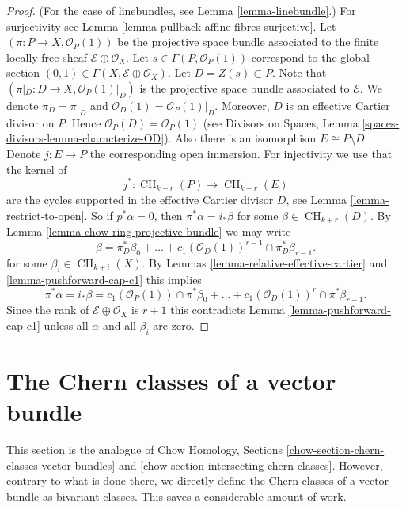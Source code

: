 \documentclass{stacks-project}
\theoremstyle{plain}
\theoremstyle{definition}
\theoremstyle{remark}
\numberwithin{equation}{subsection}
\def\CH{\mathop{\mathrm{CH}}\nolimits}
\begin{document}
\begin{proof}
(For the case of linebundles, see Lemma \ref{lemma-linebundle}.)
For surjectivity see Lemma \ref{lemma-pullback-affine-fibres-surjective}.
Let $(\pi  : P \to X, \mathcal{O}_P(1))$
be the projective space bundle associated
to the finite locally free sheaf $\mathcal{E} \oplus \mathcal{O}_X$.
Let $s \in \Gamma(P, \mathcal{O}_P(1))$ correspond to the global
section $(0, 1) \in \Gamma(X, \mathcal{E} \oplus \mathcal{O}_X)$.
Let $D = Z(s) \subset P$. Note that
$(\pi|_D : D \to X , \mathcal{O}_P(1)|_D)$
is the projective space bundle associated
to $\mathcal{E}$. We denote $\pi_D = \pi|_D$ and
$\mathcal{O}_D(1) = \mathcal{O}_P(1)|_D$.
Moreover, $D$ is an effective
Cartier divisor on $P$. Hence $\mathcal{O}_P(D) = \mathcal{O}_P(1)$
(see Divisors on Spaces, Lemma \ref{spaces-divisors-lemma-characterize-OD}).
Also there is an isomorphism
$E \cong P \setminus D$. Denote $j : E \to P$ the
corresponding open immersion.
For injectivity we use that the kernel of
$$
j^* :
\CH_{k + r}(P)
\longrightarrow
\CH_{k + r}(E)
$$
are the cycles supported in the effective Cartier divisor $D$,
see Lemma \ref{lemma-restrict-to-open}. So if $p^*\alpha = 0$, then
$\pi^*\alpha = i_*\beta$ for some $\beta \in \CH_{k + r}(D)$.
By Lemma \ref{lemma-chow-ring-projective-bundle} we may write
$$
\beta = \pi_D^*\beta_0 +
\ldots + c_1(\mathcal{O}_D(1))^{r - 1} \cap \pi_D^* \beta_{r - 1}.
$$
for some $\beta_i \in \CH_{k + i}(X)$.
By Lemmas \ref{lemma-relative-effective-cartier}
and \ref{lemma-pushforward-cap-c1}
this implies
$$
\pi^*\alpha = i_*\beta =
c_1(\mathcal{O}_P(1)) \cap \pi^*\beta_0 +
\ldots +
c_1(\mathcal{O}_D(1))^r \cap \pi^*\beta_{r - 1}.
$$
Since the rank of $\mathcal{E} \oplus \mathcal{O}_X$ is $r + 1$
this contradicts Lemma \ref{lemma-pushforward-cap-c1} unless all
$\alpha$ and all $\beta_i$ are zero.
\end{proof}








\section{The Chern classes of a vector bundle}
\label{section-chern-classes-vector-bundles}

\noindent
This section is the analogue of Chow Homology, Sections
\ref{chow-section-chern-classes-vector-bundles} and
\ref{chow-section-intersecting-chern-classes}.
However, contrary to what is done there, we directly
define the Chern classes of a vector bundle as bivariant classes.
This saves a considerable amount of work.
\end{document}
